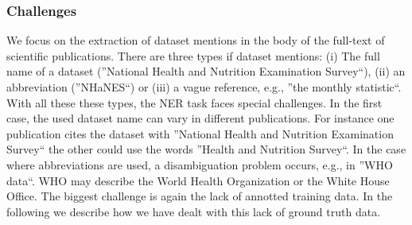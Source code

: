 \subsubsection{Challenges}
We focus on the extraction of dataset mentions in the body of the full-text of scientific publications.
There are three types if dataset mentions:
(i) The full name of a dataset (''National Health and Nutrition Examination Survey``),
(ii) an abbreviation (''NHaNES``) or (iii) a vague reference, e.g., ''the monthly statistic``.
With all these these types, the NER task faces special challenges.
In the first case, the used dataset name can vary in different publications.
For instance one publication cites the dataset with ''National Health and Nutrition Examination Survey`` the other could use the words  ''Health and Nutrition Survey``.
In the case where abbreviations are used, a disambiguation problem occurs, e.g., in ''WHO data``. WHO may describe the World Health Organization or the White House Office.
The biggest challenge is again the lack of annotted training data.
In the following we describe how we have dealt with this lack of ground truth data.

